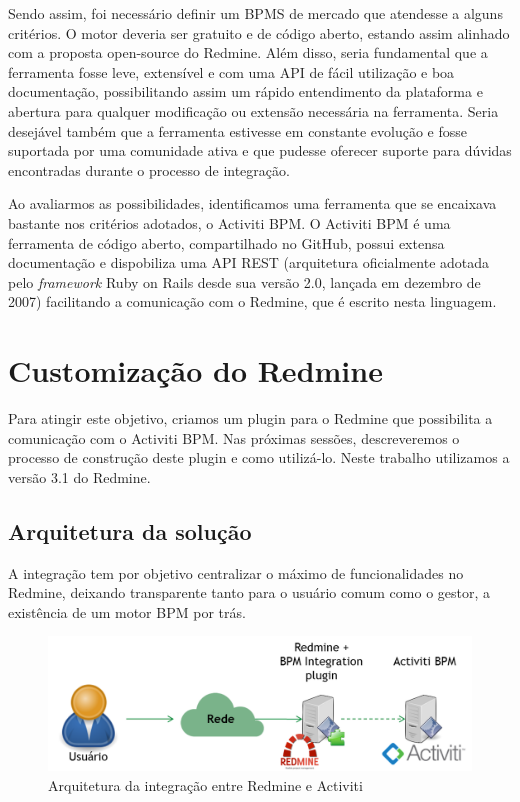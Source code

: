 Sendo assim, foi necessário definir um BPMS de mercado que atendesse a alguns critérios. O motor deveria ser gratuito e de código aberto, estando assim alinhado com a proposta open-source do Redmine. Além disso, seria fundamental que a ferramenta fosse leve, extensível e com uma API de fácil utilização e boa documentação, possibilitando assim um rápido entendimento da plataforma e abertura para qualquer modificação ou extensão necessária na ferramenta. Seria desejável também que a ferramenta estivesse em constante evolução e fosse suportada por uma comunidade ativa e que pudesse oferecer suporte para dúvidas encontradas durante o processo de integração.

Ao avaliarmos as possibilidades, identificamos uma ferramenta que se encaixava bastante nos critérios adotados, o Activiti BPM. O Activiti BPM é uma ferramenta de código aberto, compartilhado no GitHub\cite{activiti_github}, possui extensa documentação\cite{activiti-userguide} e dispobiliza uma API REST (arquitetura oficialmente adotada pelo \textit{framework} Ruby on Rails desde sua versão 2.0, lançada em dezembro de 2007\cite{rails_rest_support}) facilitando a comunicação com o Redmine, que é escrito nesta linguagem. 

\section{Customização do Redmine}\label{sec:integracao_redmine_activiti-implementacao}

Para atingir este objetivo, criamos um plugin para o Redmine que possibilita a comunicação com o Activiti BPM. Nas próximas sessões, descreveremos o processo de construção deste plugin e como utilizá-lo. Neste trabalho utilizamos a versão 3.1 do Redmine\cite{redmine31}.

\subsection{Arquitetura da solução}\label{sec:integracao_redmine_activiti_implementacao-arquitetura}

A integração tem por objetivo centralizar o máximo de funcionalidades no Redmine, deixando transparente tanto para o usuário comum como o gestor, a existência de um motor BPM por trás.

\begin{figure}[H]
\centering
\includegraphics[width=1\textwidth]{imagens/arquitetura_desenvolvida_bpm_integration.png}
\caption{Arquitetura da integração entre Redmine e Activiti}
\label{fig:arquitetura_integracao_redmine_bpm}
\end{figure}

